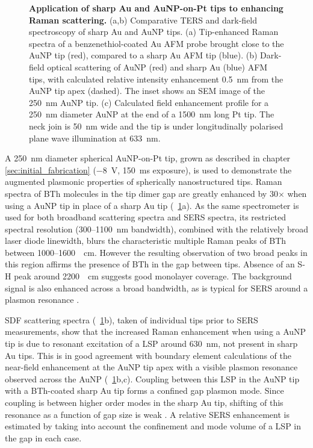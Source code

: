 \documentclass{article}
\begin{document}
\begin{figure}[bt]
\caption[Application of sharp Au and AuNP-on-Pt tips to enhancing Raman scattering]{\textbf{Application of sharp Au and AuNP-on-Pt tips to enhancing Raman scattering.} (a,b) Comparative TERS and dark-field spectroscopy of sharp Au and AuNP tips. (a) Tip-enhanced Raman spectra of a benzenethiol-coated Au AFM probe brought close to the AuNP tip (red), compared to a sharp Au AFM tip (blue). (b) Dark-field optical scattering of AuNP (red) and sharp Au (blue) AFM tips, with calculated relative intensity enhancement \SI{0.5}{nm} from the AuNP tip apex (dashed). The inset shows an SEM image of the \SI{250}{nm} AuNP tip. (c) Calculated field enhancement profile for a \SI{250}{nm} diameter AuNP at the end of a \SI{1500}{nm} long Pt tip. The neck join is \SI{50}{nm} wide and the tip is under longitudinally polarised plane wave illumination at \SI{633}{nm}.}
\label{fig:ters_comparison}
\end{figure}

A \SI{250}{nm} diameter spherical AuNP-on-Pt tip, grown as described in chapter \ref{sec:initial_fabrication} (\SI{-8}{V}, \SI{150}{ms} exposure), is used to demonstrate the augmented plasmonic properties of spherically nanostructured tips. Raman spectra of BTh molecules in the tip dimer gap are greatly enhanced by 30$\times$ when using a AuNP tip in place of a sharp Au tip (\figurename~\ref{fig:ters_comparison}a). As the same spectrometer is used for both broadband scattering spectra and SERS spectra, its restricted spectral resolution (300--\SI{1100}{nm} bandwidth), combined with the relatively broad laser diode linewidth, blurs the characteristic multiple Raman peaks of BTh between 1000--\SI{1600}{\per\centi\metre}. However the resulting observation of two broad peaks in this region affirms the presence of BTh in the gap between tips. Absence of an S-H peak around \SI{2200}{\per\centi\metre} suggests good monolayer coverage. The background signal is also enhanced across a broad bandwidth, as is typical for SERS around a plasmon resonance \cite{mahajan2009}.

SDF scattering spectra (\figurename~\ref{fig:ters_comparison}b), taken of individual tips prior to SERS measurements, show that the increased Raman enhancement when using a AuNP tip is due to resonant excitation of a LSP around \SI{630}{nm}, not present in sharp Au tips. This is in good agreement with boundary element calculations of the near-field enhancement at the AuNP tip apex with a visible plasmon resonance observed across the AuNP (\figurename~\ref{fig:ters_comparison}b,c).
Coupling between this LSP in the AuNP tip with a BTh-coated sharp Au tip forms a confined gap plasmon mode. Since coupling is between higher order modes in the sharp Au tip, shifting of this resonance as a function of gap size is weak \cite{downes2006, hugall2012}. A relative SERS enhancement is estimated by taking into account the confinement and mode volume of a LSP in the gap in each case.
\end{document}
